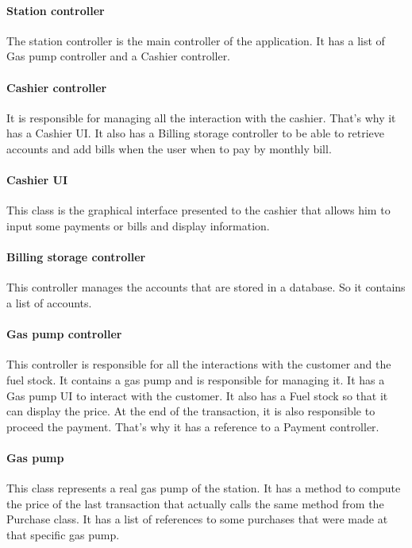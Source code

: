 \paragraph{Station controller}
The station controller is the main controller of the application. It has a list of Gas pump controller and a Cashier controller. 

\paragraph{Cashier controller}
It is responsible for managing all the interaction with the cashier. That's why it has a Cashier UI. It also has a Billing storage controller to be able to retrieve accounts and add bills when the user when to pay by monthly bill.

\paragraph{Cashier UI}
This class is the graphical interface presented to the cashier that allows him to input some payments or bills and display information.

\paragraph{Billing storage controller}
This controller manages the accounts that are stored in a database. So it contains a list of accounts.

\paragraph{Gas pump controller}
This controller is responsible for all the interactions with the customer and the fuel stock.
It contains a gas pump and is responsible for managing it. It has a Gas pump UI to interact with the customer. It also has a Fuel stock so that it can display the price.
At the end of the transaction, it is also responsible to proceed the payment. That's why it has a reference to a Payment controller.

\paragraph{Gas pump}
This class represents a real gas pump of the station. It has a method to compute the price of the last transaction that actually calls the same method from the Purchase class.
It has a list of references to some purchases that were made at that specific gas pump.

